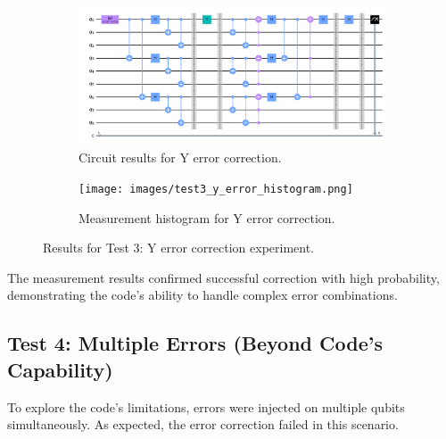 \documentclass[12pt,a4paper]{article}
\begin{document}
\begin{figure}[H]
    \centering
    \begin{subfigure}[b]{0.49\textwidth}
        \includegraphics[width=\textwidth]{images/test3_y_error_correction.png}
        \caption{Circuit results for Y error correction.}
    \end{subfigure}
    \hfill
    \begin{subfigure}[b]{0.49\textwidth}
        \texttt{[image: images/test3\_y\_error\_histogram.png]}
        \caption{Measurement histogram for Y error correction.}
    \end{subfigure}
    \caption{Results for Test 3: Y error correction experiment.}
    \label{fig:y_error_results}
\end{figure}

The measurement results confirmed successful correction with high probability, demonstrating the code's ability to handle complex error combinations.

\subsection{Test 4: Multiple Errors (Beyond Code's Capability)}

To explore the code's limitations, errors were injected on multiple qubits simultaneously. As expected, the error correction failed in this scenario.
\end{document}
